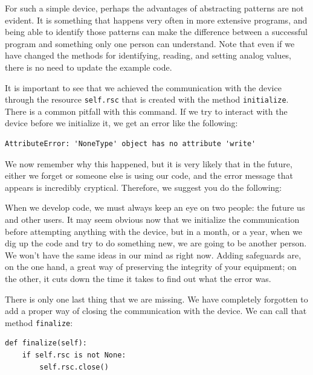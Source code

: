 For such a simple device, perhaps the advantages of abstracting patterns are not evident. It is something that happens very often in more extensive programs, and being able to identify those patterns can make the difference between a successful program and something only one person can understand. Note that even if we have changed the methods for identifying, reading, and setting analog values, there is no need to update the example code.

It is important to see that we achieved the communication with the device through the resource \texttt{self.rsc} that is created with the method \texttt{initialize}. There is a common pitfall with this command. If we try to interact with the device before we initialize it, we get an error like the following:

\begin{verbatim}
AttributeError: 'NoneType' object has no attribute 'write'
\end{verbatim}

We now remember why this happened, but it is very likely that in the future, either we forget or someone else is using our code, and the error message that appears is incredibly cryptical. Therefore, we suggest you do the following:


When we develop code, we must always keep an eye on two people: the future us and other users. It may seem obvious now that we initialize the communication before attempting anything with the device, but in a month, or a year, when we dig up the code and try to do something new, we are going to be another person. We won't have the same ideas in our mind as right now. Adding safeguards are, on the one hand, a great way of preserving the integrity of your equipment; on the other, it cuts down the time it takes to find out what the error was.

There is only one last thing that we are missing. We have completely forgotten to add a proper way of closing the communication with the device. We can call that method \texttt{finalize}:

\begin{verbatim}
def finalize(self):
    if self.rsc is not None:
        self.rsc.close()
\end{verbatim}


